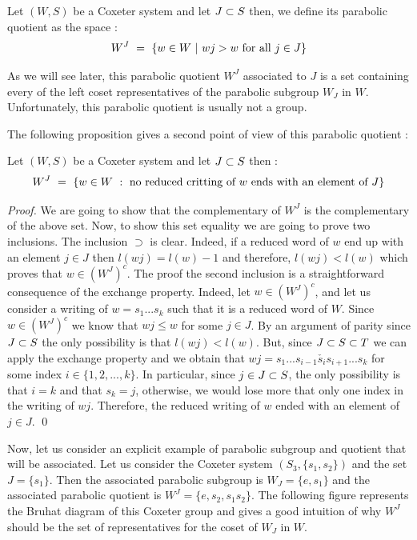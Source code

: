 \begin{definition}
	Let $(W,S)$ be a Coxeter system and let $J\subset S$ then, we define its parabolic quotient as the space :
	\begin{equation}
	W^J\text{ }=\text{ }\{w\in W\text{ } \lvert\text{ } wj>w\text{ } \mbox{for all }j\in J\}
	\end{equation}
\end{definition}

As we will see later, this parabolic quotient $W^J$ associated to $J$ is a set containing every of the left coset representatives of the parabolic subgroup $W_J$ in $W$. Unfortunately, this parabolic quotient is usually not a group.


The following proposition gives a second point of view of this parabolic quotient :
\begin{proposition}
	Let $(W,S)$ be a Coxeter system and let $J\subset S$ then :
	\begin{equation}
	W^J\text{ }=\text{ }\{w\in W\text{ } :\text{ } \mbox{no reduced critting of } w \mbox{ ends with an element of }J\}
	\end{equation}
\end{proposition}
\begin{proof}
	We are going to show that the complementary of $W^J$ is the complementary of the above set. Now, to show this set equality we are going to prove two inclusions. The inclusion $\supset$ is clear. Indeed, if a reduced word of $w$ end up with an element $j\in J$ then $l(wj)=l(w)-1$ and therefore, $l(wj)<l(w)$ which proves that $w\in (W^J)^c$. The proof the second inclusion is a straightforward consequence of the exchange property. Indeed, let $w\in (W^J)^c$, and let us consider a writing of $w=s_1...s_k$ such that it is a reduced word of $W$. Since $w\in (W^J)^c$ we know that $wj\leq w$ for some $j\in J$. By an argument of parity since $J\subset S$ the only possibility is that $l(wj)<l(w)$. But, since $J\subset S\subset T$ we can apply the exchange property and we obtain that $wj=s_1...s_{i-1}\check{s_i}s_{i+1}...s_k$ for some index $i\in \{1,2,...,k\}$. In particular, since $j\in J\subset S$, the only possibility is that $i=k$ and that $s_k=j$, otherwise, we would lose more that only one index in the writing of $wj$. Therefore, the reduced writing of $w$ ended with an element of $j\in J$. \qed
\end{proof}
Now, let us consider an explicit example of parabolic subgroup and quotient that will be associated. Let us consider the Coxeter system $(S_3,\{s_1,s_2\})$ and the set $J=\{s_1\}$. Then the associated parabolic subgroup is $W_J=\{e,s_1\}$ and the associated parabolic quotient is $W^J=\{e,s_2,s_1s_2\}$. The following figure represents the Bruhat diagram of this Coxeter group and gives a good intuition of why $W^J$ should be the set of representatives for the coset of $W_J$ in $W$.
